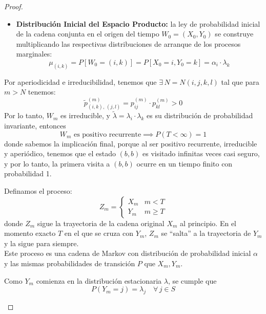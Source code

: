 \documentclass[10pt]{book}
\newcommand{\tbf}{\textbf}
\begin{document}
\begin{teo}
\begin{proof}
\begin{description}
\begin{itemize}
        \item \textbf{Distribución Inicial del Espacio Producto:} la ley de probabilidad inicial de la cadena conjunta en el origen del tiempo $W_0 = (X_0, Y_0)$ se construye multiplicando las respectivas distribuciones de arranque de los procesos marginales:
        \[
        \mu_{(i,k)} = P[W_0 = (i,k)] = P[X_0 = i, Y_0 = k] = \alpha_i \cdot \lambda_k
        \]
    \end{itemize}
    Por aperiodicidad e irreducibilidad, tenemos que $\exists \, N = N(i,j,k,l)$ tal que para $m > N$ tenemos:
    \[
    \widetilde{p}_{(i,k), \, (j,l)}^{(m)} = p_{ij}^{(m)} \cdot p_{kl}^{(m)} > 0
    \]
    Por lo tanto, $W_m$ es irreducible, y $\tilde{\lambda} = \lambda_i \cdot \lambda_k$ es su distribución de probabilidad invariante, entonces
    \[
    W_m \text{ es positivo recurrente} \implies P(T < \infty) = 1
    \]
    donde sabemos la implicación final, porque al ser positivo recurrente, irreducible y aperiódico, tenemos que el estado $(b,b)$ es visitado infinitas veces casi seguro, y por lo tanto, la primera visita a $(b,b)$ ocurre en un tiempo finito con probabilidad 1.
    
    \item[\tbf{Step 3.}] Definamos el proceso:
        \[
        Z_m = \begin{cases} 
        X_m & m < T \\ 
        Y_m & m \ge T 
        \end{cases}
        \]
        donde $Z_m$ sigue la trayectoria de la cadena original $X_m$ al principio. En el momento exacto $T$ en el que se cruza con $Y_m$, $Z_m$ se ``salta'' a la trayectoria de $Y_m$ y la sigue para siempre. \\

        \noindent 
        Este proceso es una cadena de Markov con distribución de probabilidad inicial $\alpha$ y las mismas probabilidades de transición $P$ que $X_m, Y_m$.

        \noindent 
        Como $Y_m$ comienza en la distribución estacionaria $\lambda$, se cumple que 
        $$P(Y_m = j) = \lambda_j \quad \forall \, j \in S$$


\end{description}
\end{proof}
\end{teo}
\end{document}
